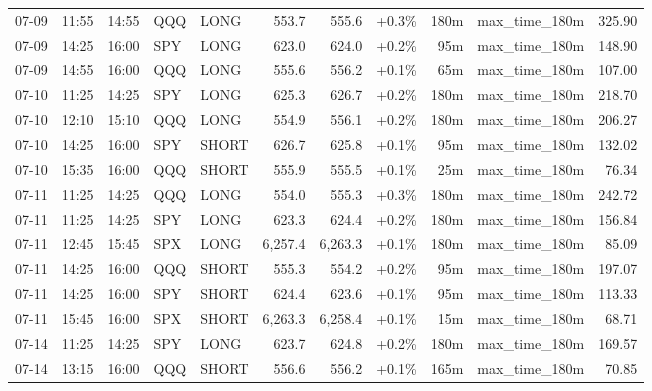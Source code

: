 \documentclass[11pt,a4paper,twoside]{article}
\begin{document}
\begin{center}
\begin{longtable}{>{\color{txtmain}}l l l l l r r r r >{\color{txtmain}}l r}
07-09 & 11:55 & 14:55 & QQQ & LONG & 553.7 & 555.6 & \textcolor{wingreen}{+0.3\%} & 180m & max\_time\_180m & \textcolor{wingreen}{325.90} \\
07-09 & 14:25 & 16:00 & SPY & LONG & 623.0 & 624.0 & \textcolor{wingreen}{+0.2\%} & 95m & max\_time\_180m & \textcolor{wingreen}{148.90} \\
07-09 & 14:55 & 16:00 & QQQ & LONG & 555.6 & 556.2 & \textcolor{wingreen}{+0.1\%} & 65m & max\_time\_180m & \textcolor{wingreen}{107.00} \\
07-10 & 11:25 & 14:25 & SPY & LONG & 625.3 & 626.7 & \textcolor{wingreen}{+0.2\%} & 180m & max\_time\_180m & \textcolor{wingreen}{218.70} \\
07-10 & 12:10 & 15:10 & QQQ & LONG & 554.9 & 556.1 & \textcolor{wingreen}{+0.2\%} & 180m & max\_time\_180m & \textcolor{wingreen}{206.27} \\
07-10 & 14:25 & 16:00 & SPY & SHORT & 626.7 & 625.8 & \textcolor{wingreen}{+0.1\%} & 95m & max\_time\_180m & \textcolor{wingreen}{132.02} \\
07-10 & 15:35 & 16:00 & QQQ & SHORT & 555.9 & 555.5 & \textcolor{wingreen}{+0.1\%} & 25m & max\_time\_180m & \textcolor{wingreen}{76.34} \\
07-11 & 11:25 & 14:25 & QQQ & LONG & 554.0 & 555.3 & \textcolor{wingreen}{+0.3\%} & 180m & max\_time\_180m & \textcolor{wingreen}{242.72} \\
07-11 & 11:25 & 14:25 & SPY & LONG & 623.3 & 624.4 & \textcolor{wingreen}{+0.2\%} & 180m & max\_time\_180m & \textcolor{wingreen}{156.84} \\
07-11 & 12:45 & 15:45 & SPX & LONG & 6,257.4 & 6,263.3 & \textcolor{wingreen}{+0.1\%} & 180m & max\_time\_180m & \textcolor{wingreen}{85.09} \\
07-11 & 14:25 & 16:00 & QQQ & SHORT & 555.3 & 554.2 & \textcolor{wingreen}{+0.2\%} & 95m & max\_time\_180m & \textcolor{wingreen}{197.07} \\
07-11 & 14:25 & 16:00 & SPY & SHORT & 624.4 & 623.6 & \textcolor{wingreen}{+0.1\%} & 95m & max\_time\_180m & \textcolor{wingreen}{113.33} \\
07-11 & 15:45 & 16:00 & SPX & SHORT & 6,263.3 & 6,258.4 & \textcolor{wingreen}{+0.1\%} & 15m & max\_time\_180m & \textcolor{wingreen}{68.71} \\
07-14 & 11:25 & 14:25 & SPY & LONG & 623.7 & 624.8 & \textcolor{wingreen}{+0.2\%} & 180m & max\_time\_180m & \textcolor{wingreen}{169.57} \\
07-14 & 13:15 & 16:00 & QQQ & SHORT & 556.6 & 556.2 & \textcolor{wingreen}{+0.1\%} & 165m & max\_time\_180m & \textcolor{wingreen}{70.85} \\

\end{longtable}
\end{center}
\end{document}
